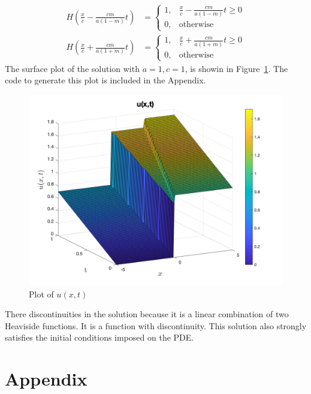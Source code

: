 \documentclass[11pt]{article}
\begin{document}
\begin{enumerate}
\begin{enumerate}[label = (\alph*)]
\begin{align*}
H\left(\frac{x}{c} - \frac{cm}{a(1-m)}t\right)  & = 
\begin{cases}
1, & \frac{x}{c} - \frac{cm}{a(1-m)}t \geq 0 \\
0, & \text{otherwise} 
\end{cases} \\
H\left(\frac{x}{c} + \frac{cm}{a(1+m)}t\right) & = 
\begin{cases}
1, & \frac{x}{c} + \frac{cm}{a(1+m)}t \geq 0 \\
0, & \text{otherwise}
\end{cases}
\end{align*}
The surface plot of the solution with $a = 1, c = 1$, is showin in Figure~\ref{fig:q4c}. The code to generate this plot is included in the Appendix. 
\begin{figure}[htp]
\begin{center}
\includegraphics[width=5in]{q4c}
\caption{Plot of $u(x,t)$}
\label{fig:q4c}
\end{center}
\end{figure}
\end{enumerate}
There discontinuities in the solution because it is a linear combination of two Heaviside functions. It is a function with discontinuity. This solution also strongly satisfies the initial conditions imposed on the PDE. 
\end{enumerate}

\section{Appendix}

\end{document}
